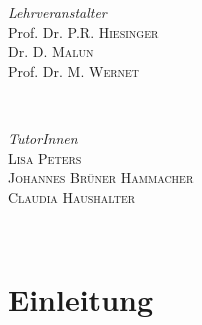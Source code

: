 \documentclass[11pt]{article}
\begin{document}
\begin{titlepage}
	\begin{minipage}{0.45\textwidth}
		\begin{flushleft}
			\large
			\textit{Lehrveranstalter}\\
			Prof. Dr. P.R. \textsc{Hiesinger}\\ 
			Dr. D. \textsc{Malun}\\ 
			Prof. Dr. M. \textsc{Wernet}
		\end{flushleft}
	\end{minipage}
	~
		\begin{minipage}{0.45\textwidth}
		\begin{flushright}
			
		\end{flushright}
	\end{minipage}
\vfill
	\begin{minipage}{0.7\textwidth}
		\begin{flushleft}
			\large
			\textit{TutorInnen}\\
			\textsc{Lisa Peters}\\
			\textsc{Johannes Brüner Hammacher}\\
			\textsc{Claudia Haushalter}
		\end{flushleft}
	\end{minipage}
	~
		\begin{minipage}{0.2\textwidth}
		\begin{flushright}
			
		\end{flushright}
	\end{minipage}

	\vfill\vfill\vfill %

	
	\vfill %
	
\end{titlepage}

\section{Einleitung}
\end{document}
